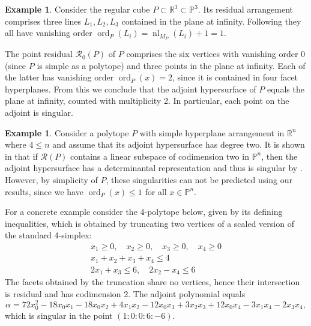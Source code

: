 \documentclass[a4paper,10pt]{amsart}
\theoremstyle{definition}
\newtheorem{ex}[defin]{Example}
\theoremstyle{plain}
\newcommand{\ord}{\operatorname{ord}}
\newcommand{\nl}{\operatorname{nl}}
\newcommand{\cR}{{\mathcal R}}
\newcommand{\R}{{\mathbb R}}
\newcommand{\pp}{\mathbb{P}}
\begin{document}
\begin{ex}
 Consider the regular cube $P \subset \R^3 \subset \pp^3$. Its residual arrangement comprises three lines $L_1, L_2, L_3$ contained in the plane at infinity. Following  they all have vanishing order $\ord_P(L_i) = \nl_{M_P}(L_i) + 1 = 1$.

 The point residual $\cR_0(P)$ of $P$ comprises the six vertices with vanishing order 0 (since $P$ is simple as a polytope) and three points in the plane at infinity. Each of the latter has vanishing order $\ord_P(x) = 2$, since it is contained in four facet hyperplanes. From this we conclude that the adjoint hypersurface of $P$ equals the plane at infinity, counted with multiplicity 2. In particular, each point on the adjoint is singular.
\end{ex}

\begin{ex}
 Consider a polytope $P$ with simple hyperplane arrangement in $\R^n$ where $4 \leq n$ and assume that its adjoint hypersurface has degree two. It is shown in \cite[Proposition 3.3]{BrueserKummerPavlov25Adjoints} that if $\cR(P)$ contains a linear subspace of codimension two in $\pp^n$, then the adjoint hypersurface has a determinantal representation and thus is singular by \cite[\S 4.1.1]{Dolgachev2012CAG}. However, by simplicity of $P$, these singularities can not be predicted using our results, since we have $\ord_P(x) \leq 1$ for all $x \in \pp^n$.

 For a concrete example consider the 4-polytope below, given by its defining inequalities, which is obtained by truncating two vertices of a scaled version of the standard 4-simplex:
 \begin{equation*}
 \begin{split}
     x_1 \geq 0, \quad
     x_2 \geq 0, \quad
     x_3 \geq 0, \quad
     x_4 \geq 0 \\
     x_1 + x_2 + x_3 + x_4 \leq 4 \\
     2x_1 + x_3 \leq 6, \quad 2x_2 - x_4 \leq 6
 \end{split}
 \end{equation*}
 The facets obtained by the truncation share no vertices, hence their intersection is residual and has codimension 2. The adjoint polynomial equals
 \begin{equation*}
     \alpha = 72x_0^2-18x_0x_1-18x_0x_2+4x_1x_2-12x_0x_3+3x_2x_3+12x_0x_4-3x_1x_4-2x_3x_4,
 \end{equation*}
 which is singular in the point $(1:0:0:6:-6)$.
\end{ex}





\end{document}
